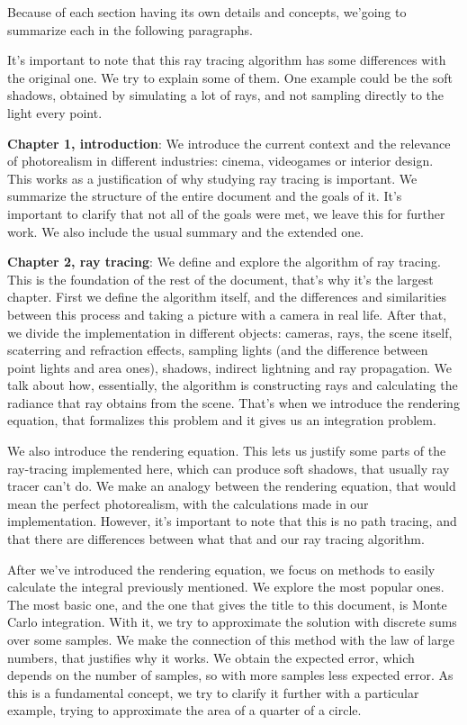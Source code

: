 \documentclass{scrbook}
\begin{document}
Because of each section having its own details and concepts, we'going to summarize each in the following paragraphs.

It's important to note that this ray tracing algorithm has some differences with the original one. We try to explain some of them. One example could be the soft shadows, obtained by simulating a lot of rays, and not sampling directly to the light every point. 

\textbf{Chapter 1, introduction}: We introduce the current context and the relevance of photorealism in different industries: cinema, videogames or interior design. This works as a justification of why studying ray tracing is important. We summarize the structure of the entire document and the goals of it. It's important to clarify that not all of the goals were met, we leave this for further work. We also include the usual summary and the extended one.

\textbf{Chapter 2, ray tracing}: We define and explore the algorithm of ray tracing. This is the foundation of the rest of the document, that's why it's the largest chapter. First we define the algorithm itself, and the differences and similarities between this process and taking a picture with a camera in real life. After that, we divide the implementation in different objects: cameras, rays, the scene itself, scaterring and refraction effects, sampling lights (and the difference between point lights and area ones), shadows, indirect lightning and ray propagation. We talk about how, essentially, the algorithm is constructing rays and calculating the radiance that ray obtains from the scene. That's when we introduce the rendering equation, that formalizes this problem and it gives us an integration problem.

We also introduce the rendering equation. This lets us justify some parts of the ray-tracing implemented here, which can produce soft shadows, that usually ray tracer can't do. We make an analogy between the rendering equation, that would mean the perfect photorealism, with the calculations made in our implementation. However, it's important to note that this is no path tracing, and that there are differences between what that and our ray tracing algorithm.

After we've introduced the rendering equation, we focus on methods to easily calculate the integral previously mentioned. We explore the most popular ones. The most basic one, and the one that gives the title to this document, is Monte Carlo integration. With it, we try to approximate the solution with discrete sums over some samples. We make the connection of this method with the law of large numbers, that justifies why it works. We obtain the expected error, which depends on the number of samples, so with more samples less expected error. As this is a fundamental concept, we try to clarify it further with a particular example, trying to approximate the area of a quarter of a circle.
\end{document}
